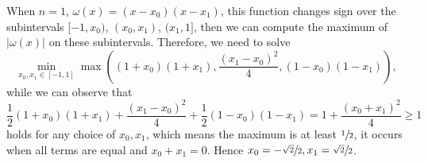 \begin{example}
    When $n = 1$, $\omega(x) = (x - x_0)(x - x_1)$, this function changes sign over the subintervals $[-1, x_0)$, $(x_0, x_1)$, $(x_1, 1]$, then we can compute the maximum of $|\omega(x)|$ on these subintervals. Therefore, we need to solve 
    \begin{equation}
        \min_{x_0, x_1\in [-1,1]}\max((1 + x_0)(1 + x_1), \frac{(x_1-x_0)^2}{4}, (1 - x_0)(1 - x_1) ),
    \end{equation}
    while we can observe that 
    \begin{equation}
       \frac{1}{2} (1 + x_0)(1 + x_1) +  \frac{(x_1-x_0)^2}{4} + \frac{1}{2}(1 - x_0)(1 - x_1) = 1 + \frac{(x_0 + x_1)^2}{4}\ge 1
    \end{equation}
    holds for any choice of $x_0, x_1$, which means the maximum is at least $\sfrac{1}{2}$, it occurs when all terms are equal and $x_0 + x_1 = 0$. Hence $x_0 = -\sfrac{\sqrt{2}}{2}, x_1 = \sfrac{\sqrt{2}}{2}$.
\end{example}

